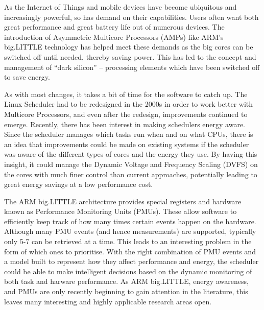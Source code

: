 As the Internet of Things and mobile devices have become ubiquitous and 
increasingly powerful, so has demand on their capabilities. Users often want 
both great performance and great battery life out of numerous devices. The 
introduction of Asymmetric Multicore Processors (AMPs) like ARM's big.LITTLE 
technology has helped meet these demands as the big cores can be switched off 
until needed, thereby saving power. This has led to the concept and management  
of ``dark silicon'' -- processing elements which have been switched off to save 
energy.

As with most changes, it takes a bit of time for the software to catch up. The 
Linux Scheduler had to be redesigned in the 2000s in order to work better with 
Multicore Processors, and even after the redesign, improvements continued to 
emerge. Recently, there has been interest in making schedulers energy aware. 
Since the scheduler manages which tasks run when and on what CPUs, there is an 
idea that improvements could be made on existing systems if the scheduler was 
aware of the different types of cores and the energy they use. By having this 
insight, it could manage the Dynamic Voltage and Frequency Scaling (DVFS) on 
the cores with much finer control than current approaches, potentially leading 
to great energy savings at a low performance cost.

The ARM big.LITTLE architecture provides special registers and hardware known 
as Performance Monitoring Units (PMUs). These allow software to efficiently 
keep track of how many times certain events happen on the hardware. Although 
many PMU events (and hence measurements) are supported, typically only 5-7 can 
be retrieved at a time. This leads to an interesting problem in the form of 
which ones to prioritise. With the right combination of PMU events and a model 
built to represent how they affect performance and energy, the scheduler could 
be able to make intelligent decisions based on the dynamic monitoring of both 
task and harware performance. As ARM big.LITTLE, energy awareness, and PMUs are 
only recently beginning to gain attention in the literature, this leaves many 
interesting and highly applicable research areas open.

